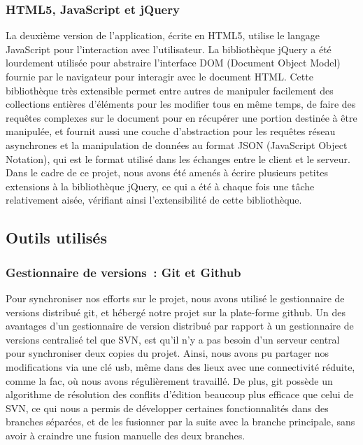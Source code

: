 \documentclass[a4paper,11pt,french]{article}
\begin{document}
\subsubsection{HTML5, JavaScript et jQuery}

La deuxième version de l'application, écrite en HTML5, utilise le langage JavaScript pour l'interaction avec l'utilisateur. La bibliothèque jQuery a été lourdement utilisée pour abstraire l'interface DOM (Document Object Model) fournie par le navigateur pour interagir avec le document HTML. Cette bibliothèque très extensible permet entre autres de manipuler facilement des collections entières d'éléments pour les modifier tous en même temps, de faire des requêtes complexes sur le document pour en récupérer une portion destinée à être manipulée, et
fournit aussi une couche d'abstraction pour les requêtes réseau asynchrones et la manipulation de données au format JSON (JavaScript Object Notation), qui est le format utilisé dans les échanges entre le client et le serveur. Dans le cadre de ce projet, nous avons été amenés à écrire plusieurs petites extensions à la bibliothèque jQuery, ce qui a été à chaque fois une tâche relativement aisée, vérifiant ainsi l'extensibilité de cette bibliothèque.

\subsection{Outils utilisés}
\subsubsection{Gestionnaire de versions~: Git et Github}

Pour synchroniser nos efforts sur le projet, nous avons utilisé le gestionnaire de versions distribué git, et hébergé notre projet sur la plate-forme github. Un des avantages d'un gestionnaire de version distribué par rapport à un gestionnaire de versions centralisé tel que SVN, est qu'il n'y a pas besoin d'un serveur central pour synchroniser deux copies du projet. Ainsi, nous avons pu partager nos modifications via une clé usb, même dans des lieux avec une connectivité réduite, comme la fac, où nous avons régulièrement travaillé. 
De plus, git possède un algorithme de résolution des conflits d'édition beaucoup plus efficace que celui de SVN, ce qui nous a permis de développer certaines fonctionnalités dans des branches séparées, et de les fusionner par la suite avec la branche principale, sans avoir à craindre une fusion manuelle des deux branches.
\end{document}
